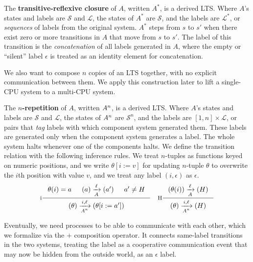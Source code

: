 \begin{defn}
The \textbf{transitive-reflexive closure} of $A$, written $A^{*}$, is a derived
LTS.  Where $A$'s states and labels are $\mathcal S$ and $\mathcal L$, the
states of $A^{*}$ are $\mathcal S$, and the labels are $\mathcal L^{*}$, or
\emph{sequences} of labels from the original system.  $A^{*}$ steps from $s$ to
$s'$ when there exist zero or more transitions in $A$ that move from $s$ to
$s'$.  The label of this transition is the \emph{concatenation} of all labels
generated in $A$, where the empty or ``silent'' label $\epsilon$ is treated as
an identity element for concatenation.
\end{defn}

We also want to compose $n$ copies of an LTS together, with no explicit
communication between them.  We apply this construction later to lift a
single-CPU system to a multi-CPU system.

\begin{defn}
The \textbf{$n$-repetition} of $A$, written $\smulti{n}{A}$, is a derived LTS.
Where $A$'s states and labels are $\mathcal S$ and $\mathcal L$, the states of
$\smulti{n}{A}$ are $\mathcal S^n$, and the labels are $[1, n] \times \mathcal
L$, or pairs that \emph{tag} labels with which component system generated them.
These labels are generated only when the component system generates a label.
The whole system halts whenever one of the components halts.  We define the
transition relation with the following inference rules. We treat $n$-tuples as
functions keyed on numeric positions, and we write $\theta[i := v]$ for
updating $n$-tuple $\theta$ to overwrite the $i$th position with value $v$, and
we treat any label $(i, \epsilon)$ as $\epsilon$.
\small
$$\inference[i]
{\theta(i) = a & \io{$A$}{a}{a'}{\ell} & a' \neq H}
{\io{$\smulti{n}{A}$}{\theta}{\theta[i:=a']}{i,\ell}}
\quad \inference[H]
{\io{$A$}{\theta(i)}{H}{\ell}}
{\io{$\smulti{n}{A}$}{\theta}{H}{i,\ell}}
$$
\end{defn}

Eventually, we need processes to be able to communicate with each
other, which we formalize via the $+$ composition operator. It
connects same-label transitions in the two systems, treating the label
as a cooperative communication event that may now be hidden from the
outside world, as an $\epsilon$ label.

